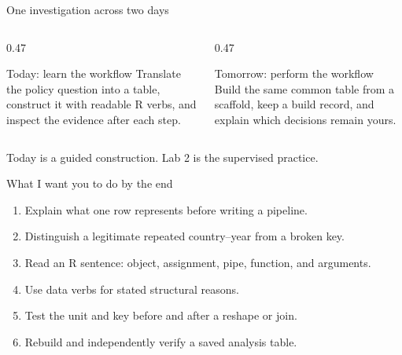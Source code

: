 \begin{frame}{One investigation across two days}
  \begin{columns}[T,onlytextwidth]
    \begin{column}{0.47\textwidth}
      \begin{block}{Today: learn the workflow}
        Translate the policy question into a table, construct it with readable R
        verbs, and inspect the evidence after each step.
      \end{block}
    \end{column}
    \begin{column}{0.47\textwidth}
      \begin{block}{Tomorrow: perform the workflow}
        Build the same common table from a scaffold, keep a build record, and
        explain which decisions remain yours.
      \end{block}
    \end{column}
  \end{columns}

  \vfill
  Today is a guided construction. Lab 2 is the supervised practice.
\end{frame}

\begin{frame}{What I want you to do by the end}
  \begin{enumerate}
    \item Explain what one row represents before writing a pipeline.
    \item Distinguish a legitimate repeated country--year from a broken key.
    \item Read an R sentence: object, assignment, pipe, function, and arguments.
    \item Use data verbs for stated structural reasons.
    \item Test the unit and key before and after a reshape or join.
    \item Rebuild and independently verify a saved analysis table.
  \end{enumerate}
\end{frame}

